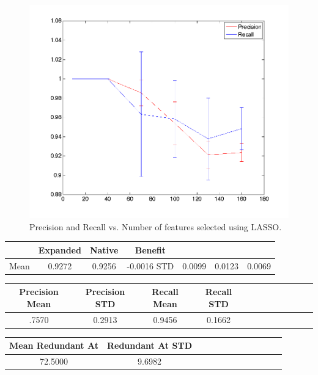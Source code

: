 \begin{center}
\begin{figure}[!ht]
\centering
\includegraphics[width=.7\textwidth]{../images/precisionrecallExpansion.png}
\caption{Precision and Recall vs. Number of features selected using LASSO.}
\label{fig:prec recall}
\end{figure}
\end{center} 



\begin{tabular}{lccc}
\hline
&Expanded&Native&Benefit
\\
\hline
Mean&0.9272&0.9256&-0.0016
STD&0.0099&0.0123&0.0069
\end{tabular}


\begin{tabular}{cccccccccccc}
\hline
Precision Mean&Precision STD&Recall Mean&Recall STD
\\
\hline
.7570&0.2913&0.9456&0.1662
\end{tabular}


\begin{tabular}{cccccccccccc}
\hline
Mean Redundant At&Redundant At STD\\
\hline
72.5000&9.6982
\end{tabular}
